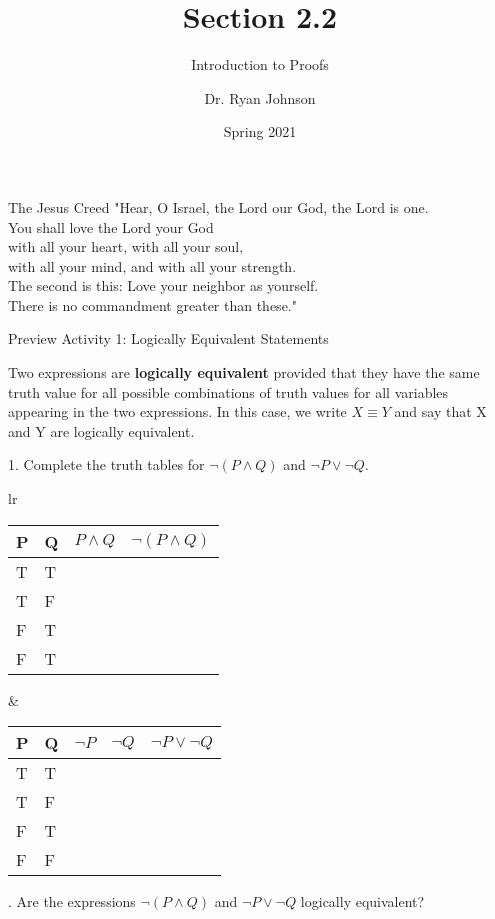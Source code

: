 \documentclass{beamer}
\title{Section 2.2}
\subtitle{Introduction to Proofs}
\author{Dr. Ryan Johnson}
\institute{Grace College}
\date{Spring 2021}
\begin{document}
\begin{frame}[plain]
    \maketitle
\end{frame}

\begin{frame}{The Jesus Creed}
\Large{
"Hear, O Israel, the Lord our God, the Lord is one.\\
You shall love the Lord your God\\
\;\; with all your heart, with all your soul,\\
\;\; with all your mind, and with all your strength.\\
The second is this: Love your neighbor as yourself.\\
There is no commandment greater than these."
}
\end{frame}

\begin{frame}{Preview Activity 1: Logically Equivalent Statements}
	\begin{definition}
		Two expressions are \textbf{logically equivalent} provided that they have
		the same truth value for all possible combinations of truth values for all variables
		appearing in the two expressions. In this case, we write $X \equiv Y$ and say
		that X and Y are logically equivalent.
	\end{definition}
	1. Complete the truth tables for $\neg (P \wedge Q)$ and $\neg P \vee \neg Q$. \pause
	
	\begin{center}
		\begin{tabular}{lr}
			\begin{tabular}{|l|l|l|l|}
				\hline
				P & Q & $P \wedge Q$ & $\neg (P \wedge Q)$\\ \hline
				T&T&& \\ \hline
				T&F&& \\ \hline
				F&T&& \\ \hline
				F&T&& \\ \hline
			\end{tabular}
			&
			\begin{tabular}{|l|l|l|l|l|}
				\hline
				P & Q & $\neg P$ & $\neg Q$ & $\neg P \vee \neg Q$\\ \hline
				T&T&&& \\ \hline
				T&F&&& \\ \hline
				F&T&&& \\ \hline
				F&F&&& \\ \hline
			\end{tabular}
		\end{tabular}
	\end{center}
	. Are the expressions $\neg (P \wedge Q)$ and $\neg P \vee \neg Q$ logically equivalent?
\end{frame} 
\end{document}
